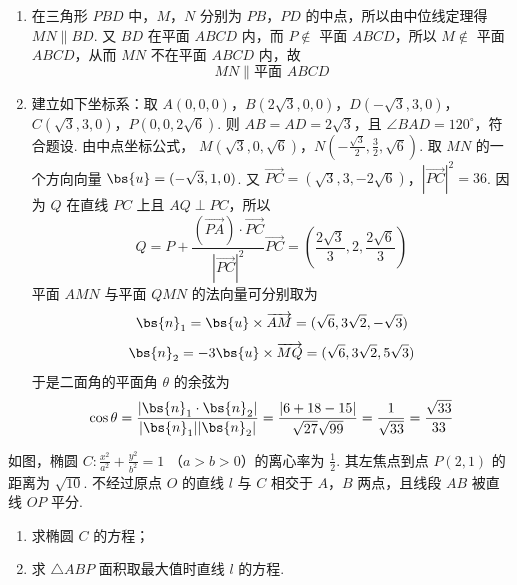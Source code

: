 \begin{solution}
\begin{enumerate}
\item 在三角形 \(PBD\) 中，\(M\)，\(N\) 分别为 \(PB\)，\(PD\) 的中点，所以由中位线定理得
\(MN\parallel BD\). 又 \(BD\) 在平面 \(ABCD\) 内，而 \(P\notin\) 平面 \(ABCD\)，所以 \(M\notin\) 平面 \(ABCD\)，从而 \(MN\) 不在平面 \(ABCD\) 内，故
\[
MN\parallel\text{平面 }ABCD
\]

\item 建立如下坐标系：取
\(A(0,0,0)\)，\(B(2\sqrt{3},0,0)\)，\(D(-\sqrt{3},3,0)\)，\(C(\sqrt{3},3,0)\)，\(P(0,0,2\sqrt{6})\).
则 \(AB=AD=2\sqrt{3}\)，且 \(\angle BAD=120^\circ\)，符合题设. 由中点坐标公式，
\(M(\sqrt{3},0,\sqrt{6})\)，\(N\left(-\frac{\sqrt{3}}{2},\frac{3}{2},\sqrt{6}\right)\).
取 \(MN\) 的一个方向向量 \(\bs{u}=(-\sqrt{3},1,0)\). 又
\(\overrightarrow{PC}=(\sqrt{3},3,-2\sqrt{6})\)，\(|\overrightarrow{PC}|^2=36\).
因为 \(Q\) 在直线 \(PC\) 上且 \(AQ\perp PC\)，所以
\[
Q=P+\frac{(\overrightarrow{PA})\cdot\overrightarrow{PC}}{|\overrightarrow{PC}|^2}\overrightarrow{PC}
=\left(\frac{2\sqrt{3}}{3},2,\frac{2\sqrt{6}}{3}\right)
\]
平面 \(AMN\) 与平面 \(QMN\) 的法向量可分别取为
\[
\bs{n}_1=\bs{u}\times\overrightarrow{AM}
=(\sqrt{6},3\sqrt{2},-\sqrt{3})
\]
\[
\bs{n}_2=-3\bs{u}\times\overrightarrow{MQ}
=(\sqrt{6},3\sqrt{2},5\sqrt{3})
\]
于是二面角的平面角 \(\theta\) 的余弦为
\[
\cos\theta
=\frac{|\bs{n}_1\cdot\bs{n}_2|}{|\bs{n}_1||\bs{n}_2|}
=\frac{|6+18-15|}{\sqrt{27}\sqrt{99}}
=\frac{1}{\sqrt{33}}
=\frac{\sqrt{33}}{33}
\]
\end{enumerate}
\end{solution}

\begin{problem}
如图，椭圆 \(C: \frac{x^2}{a^2} + \frac{y^2}{b^2} = 1 \) （\(a > b > 0\)）的离心率为 \(\frac{1}{2}\). 其左焦点到点 \(P(2,1)\) 的距离为 \(\sqrt{10}\). 不经过原点 \(O\) 的直线 \(l\) 与 \(C\) 相交于 \(A\)，\(B\) 两点，且线段 \(AB\) 被直线 \(OP\) 平分.
\begin{enumerate}
\item 求椭圆 \(C\) 的方程；
\item 求 \( \triangle ABP \) 面积取最大值时直线 \(l\) 的方程.
\end{enumerate}
\end{problem}

